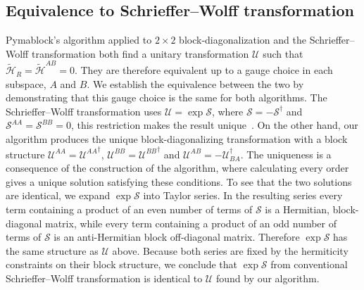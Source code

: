 \subsection{Equivalence to Schrieffer--Wolff transformation}
\label{seq:SW_equivalence}
Pymablock's algorithm applied to $2\times 2$ block-diagonalization and the Schrieffer--Wolff transformation both find a unitary transformation $\mathcal{U}$ such that $\tilde{\mathcal{H}}_{R} = \tilde{\mathcal{H}}^{AB}=0$.
They are therefore equivalent up to a gauge choice in each subspace, $A$ and $B$.
We establish the equivalence between the two by demonstrating that this gauge choice is the same for both algorithms.
The Schrieffer--Wolff transformation uses $\mathcal{U} = \exp \mathcal{S}$, where $\mathcal{S} = -\mathcal{S}^\dagger$ and $\mathcal{S}^{AA} = \mathcal{S}^{BB} = 0$, this restriction makes the result unique~\cite{Bravyi_2011}.
On the other hand, our algorithm produces the unique block-diagonalizing transformation with a block structure $\mathcal{U}^{AA} = {\mathcal{U}^{AA}}^{\dag}$, $\mathcal{U}^{BB} = {\mathcal{U}^{BB}}^{\dag}$ and $\mathcal{U}^{AB} = -\mathcal{U}_{BA}^{\dag}$.
The uniqueness is a consequence of the construction of the algorithm, where calculating every order gives a unique solution satisfying these conditions.
To see that the two solutions are identical, we expand $\exp \mathcal{S}$ into Taylor series.
In the resulting series every term containing a product of an even number of terms of $\mathcal{S}$ is a Hermitian, block-diagonal matrix, while every term containing a product of an odd number of terms of $\mathcal{S}$ is an anti-Hermitian block off-diagonal matrix.
Therefore $\exp \mathcal{S}$ has the same structure as $\mathcal{U}$ above.
Because both series are fixed by the hermiticity constraints on their block structure, we conclude that $\exp \mathcal{S}$ from conventional Schrieffer--Wolff transformation is identical to $\mathcal{U}$ found by our algorithm.

